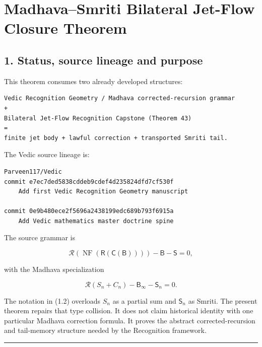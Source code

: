 \hypertarget{madhavasmriti-bilateral-jet-flow-closure-theorem}{%
\chapter{Madhava--Smriti Bilateral Jet-Flow Closure Theorem}\label{madhavasmriti-bilateral-jet-flow-closure-theorem}}

\hypertarget{status-source-lineage-and-purpose}{%
\section{1. Status, source lineage and purpose}\label{status-source-lineage-and-purpose}}

This theorem consumes two already developed structures:

\begin{verbatim}
Vedic Recognition Geometry / Madhava corrected-recursion grammar
+
Bilateral Jet-Flow Recognition Capstone (Theorem 43)
=
finite jet body + lawful correction + transported Smriti tail.
\end{verbatim}

The Vedic source lineage is:

\begin{verbatim}
Parveen117/Vedic
commit e7ec7ded5838cddeb9cdef4d235824dfd7cf530f
    Add first Vedic Recognition Geometry manuscript

commit 0e9b480ece2f5696a2438199edc689b793f6915a
    Add Vedic mathematics master doctrine spine
\end{verbatim}

The source grammar is

\[
\mathcal R\!\left(\operatorname{NF}(\mathsf R(\mathsf C(\mathsf B)))\right)
-\mathsf B-\mathsf S=0,
\tag{1.1}
\]

with the Madhava specialization

\[
\mathcal R(S_n+C_n)-\mathsf B_\infty-\mathsf S_n=0.
\tag{1.2}
\]

The notation in (1.2) overloads \(S_n\) as a partial sum and \(\mathsf S_n\) as
Smriti. The present theorem repairs that type collision. It does not claim
historical identity with one particular Madhava correction formula. It proves
the abstract corrected-recursion and tail-memory structure needed by the
Recognition framework.

\begin{center}\rule{0.5\linewidth}{0.5pt}\end{center}

